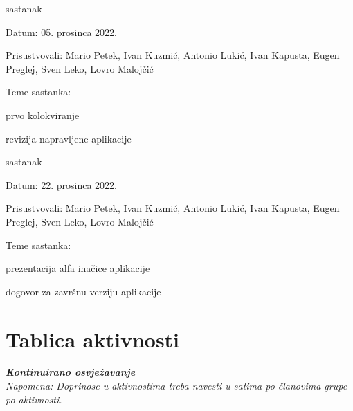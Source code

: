\begin{packed_enum}
			\item  sastanak
			\item[] \begin{packed_item}
				\item Datum: 05. prosinca 2022.
				\item Prisustvovali: Mario Petek, Ivan Kuzmić, Antonio Lukić, Ivan Kapusta, Eugen Preglej, Sven Leko, Lovro Malojčić
				\item Teme sastanka: 
				\begin{packed_item}
					\item  prvo kolokviranje
					\item  revizija napravljene aplikacije
				\end{packed_item}
			\end{packed_item}
		
			\item  sastanak
			\item[] \begin{packed_item}
				\item Datum: 22. prosinca 2022.
				\item Prisustvovali: Mario Petek, Ivan Kuzmić, Antonio Lukić, Ivan Kapusta, Eugen Preglej, Sven Leko, Lovro Malojčić
				\item Teme sastanka: 
				\begin{packed_item}
					\item  prezentacija alfa inačice aplikacije
					\item  dogovor za završnu verziju aplikacije
				\end{packed_item}
			\end{packed_item}
			
			
			
		\end{packed_enum}
		
		\eject
		\section*{Tablica aktivnosti}
		
			\textbf{\textit{Kontinuirano osvježavanje}}\\
			
			 \textit{Napomena: Doprinose u aktivnostima treba navesti u satima po članovima grupe po aktivnosti.}

